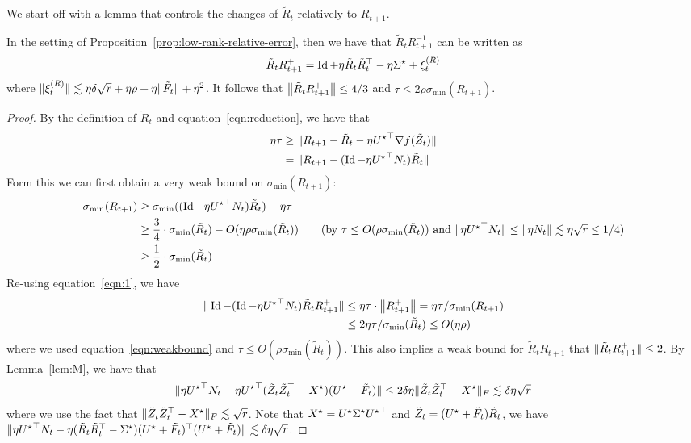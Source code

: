 We start off with a lemma that controls the changes of $\tilde{R}_t$ relatively to $R_{t+1}$.  
\begin{lem}\label{lem:RtRtplus1}
	In the setting of Proposition~\ref{prop:low-rank-relative-error}, then we have that $\tilde{R}_tR_{t+1}^{-1}$ can be written as
	\begin{align*}
		\tilde{R}_tR_{t+1}^{+} = \operatorname{Id} + \eta \tilde{R}_t\tilde{R}_t^\top - \eta {{\Sigma}^\star} + \xi_t^{(R)}
	\end{align*}
where $\|\xi_t^{(R)}\| \lesssim \eta \delta\sqrt{r} + \eta \rho + \eta \|\tilde{F}_t\| + \eta^2$. It follows that $\left\|\tilde{R}_tR_{t+1}^+\right\|\le 4/3$ and $\tau \leq 2 \rho \sigma_{\min}(R_{t+1})$. 
\end{lem}
\begin{proof}
	By the definition of $\tilde{R}_t$ and equation~\eqref{eqn:reduction}, we have that
	\begin{align}
	\eta \tau & \ge \|{R}_{t + 1} - \tilde{R}_t - \eta {{U}^\star}^{\top} \nabla f(\tilde{Z}_t) \| \nonumber\\
	& = \|{R}_{t + 1} - (\operatorname{Id} - \eta {{U}^\star}^\top N_t)\tilde{R}_t\| \label{eqn:1}
	\end{align}
Form this we can first obtain a very weak bound on $\sigma_{\min}(R_{t+1})$:
		\begin{align}
\sigma_{\min}(\bR_{t + 1}) & \ge  \sigma_{\min}((\Id - \eta \bUg^\top N_t)\tilde{R}_t) - \eta \tau  \nonumber\\
& \ge  \frac{3}{4}\cdot \sigma_{\min}(\tilde{R}_t) - O(\eta \rho \sigma_{\min}(\tilde{R}_t)) \tag{by $\tau \le O(\rho \sigma_{\min}(\tilde{R}_t))$ and $\norm{\eta \bUg^\top N_t}\le \Norm{\eta N_t}\lesssim \eta\sqrt{r}\le 1/4$}\\
&\ge \frac{1}{2}\cdot \sigma_{\min}(\tilde{R}_t)\label{eqn:weakbound}
	\end{align}
	Re-using equation~\eqref{eqn:1}, we have 
		\begin{align}
\|\operatorname{Id} - (\operatorname{Id} - \eta {{U}^\star}^\top N_t)\tilde{R}_tR_{t+1}^+\|& \le \eta \tau\cdot \left\|R_{t+1}^+\right\| = \eta \tau/\sigma_{\min}(R_{t+1})\nonumber\\
 &\le 2\eta \tau/\sigma_{\min}(\tilde{R}_t) \le O(\eta \rho)\label{eqn:3}
\end{align}
where we used equation~\eqref{eqn:weakbound} and $\tau \le O(\rho \sigma_{\min}(\tilde{R}_t))$. This also implies a weak bound for $\tilde{R}_tR_{t+1}^+$ that $\|\tilde{R}_tR_{t+1}^+\|\le 2$. 
By Lemma~\ref{lem:M}, we have that 
\begin{align*}
\|\eta{{U}^\star}^\top N_t -\eta {{U}^\star}^\top (\tilde{Z}_t\tilde{Z}_t^\top - X^\star)({{U}^\star} + \tilde{F}_t)\| \le 2\delta \eta \|\tilde{Z}_t\tilde{Z}_t^\top - X^\star\|_F\lesssim \delta \eta \sqrt{r}
\end{align*}
where we use the fact that $\|\tilde{Z}_t\tilde{Z}_t^\top - X^\star\|_F\lesssim \sqrt{r}$.  Note that $ {X}^\star = {{U}^\star} {{\Sigma}^\star}{{U}^\star}^\top $ and $\tilde{Z}_t = ({{U}^\star} + \tilde{F}_t)\tilde{R}_t$,  we have $\|\eta{{U}^\star}^\top N_t -\eta (\tilde{R}_t\tilde{R}_t^\top-{{\Sigma}^\star}) ({{U}^\star}+\tilde{F}_t)^\top({{U}^\star} +\tilde{F}_t)\| \lesssim \delta \eta \sqrt{r}$. 


\end{proof}
